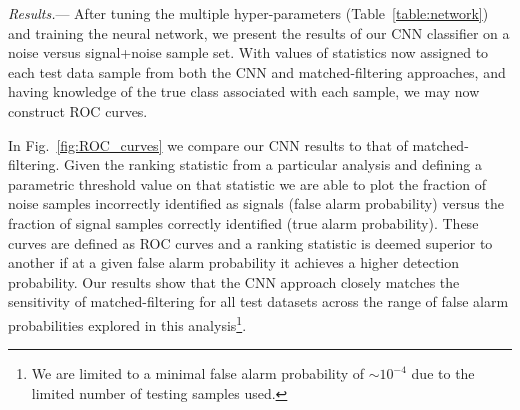 \documentclass[%
showpacs,
 amsmath,amssymb,
 aps,
 twocolumn,
 prl,
 reprint,
floatfix,
]{revtex4-1}
\newcommand{\optsnr}{\rho_{\mathrm{opt}}}
\newcommand{\cnnsnreight}{97.88}
\begin{document}
%
%
%
%

%
%
\textit{Results.}---
%
%
After tuning the multiple hyper-parameters (Table~\ref{table:network}) and
training the neural network, we present the results of our \ac{CNN} classifier
on a noise versus signal+noise sample set. With values of statistics now
assigned to each test data sample from both the \ac{CNN} and matched-filtering
approaches, and having knowledge of the true class associated with each sample,
we may now construct \ac{ROC} curves. 

%
%

%
%
In Fig.~\ref{fig:ROC_curves} we compare our \ac{CNN} results to that of
matched-filtering. Given the ranking statistic from a particular analysis and
defining a parametric threshold value on that statistic we are able to plot the
fraction of noise samples incorrectly identified as signals (false alarm
probability) versus the fraction of signal samples correctly identified (true
alarm probability). These curves are defined as \ac{ROC} curves and a ranking
statistic is deemed superior to another if at a given false alarm probability
it achieves a higher detection probability. Our results show that the \ac{CNN}
approach closely matches the sensitivity of matched-filtering for all test
datasets across the range of false alarm probabilities explored in this
analysis\footnote{We are limited to a minimal false alarm probability of $\sim
10^{-4}$ due to the limited number of testing samples used.}.
\end{document}
